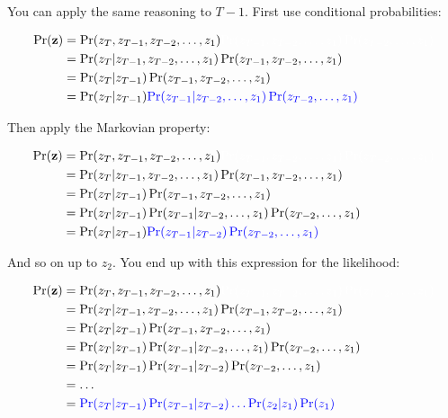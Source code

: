 \documentclass[
  12pt,
]{krantz}
\begin{document}
You can apply the same reasoning to \(T-1\). First use conditional probabilities:

\begin{align*}
\Pr(\mathbf{z}) &= \Pr(z_T, z_{T-1}, z_{T-2}, \ldots, z_1) \color{white}{\Pr(z_{T-1}, z_{T-2},\ldots, z_1) \Pr(z_{T-2}, \ldots, z_1)}\\
                &= \Pr(z_T | z_{T-1}, z_{T-2},\ldots, z_1) \Pr(z_{T-1}, z_{T-2},\ldots, z_1) \\
                &= \Pr(z_T | z_{T-1}) \Pr(z_{T-1}, z_{T-2},\ldots, z_1) \\
                &= \Pr(z_T | z_{T-1}) \color{blue}{\Pr(z_{T-1} | z_{T-2}, \ldots, z_1) \Pr(z_{T-2}, \ldots, z_1)}\\
\end{align*}

Then apply the Markovian property:

\begin{align*}
\Pr(\mathbf{z}) &= \Pr(z_T, z_{T-1}, z_{T-2}, \ldots, z_1) \color{white}{\Pr(z_{T-1}, z_{T-2},\ldots, z_1) \Pr(z_{T-2}, \ldots, z_1)}\\
                &= \Pr(z_T | z_{T-1}, z_{T-2},\ldots, z_1) \Pr(z_{T-1}, z_{T-2},\ldots, z_1) \\
                &= \Pr(z_T | z_{T-1}) \Pr(z_{T-1}, z_{T-2},\ldots, z_1) \\
                &= \Pr(z_T | z_{T-1}) \Pr(z_{T-1} | z_{T-2}, \ldots, z_1) \Pr(z_{T-2}, \ldots, z_1)\\
                &= \Pr(z_T | z_{T-1}) \color{blue}{\Pr(z_{T-1} | z_{T-2})} \Pr(z_{T-2}, \ldots, z_1)\\
\end{align*}

And so on up to \(z_2\). You end up with this expression for the likelihood:

\begin{align*}
\Pr(\mathbf{z}) &= \Pr(z_T, z_{T-1}, z_{T-2}, \ldots, z_1) \color{white}{\Pr(z_{T-1}, z_{T-2},\ldots, z_1) \Pr(z_{T-2}, \ldots, z_1)}\\
                &= \Pr(z_T | z_{T-1}, z_{T-2},\ldots, z_1) \Pr(z_{T-1}, z_{T-2},\ldots, z_1) \\
                &= \Pr(z_T | z_{T-1}) \Pr(z_{T-1}, z_{T-2},\ldots, z_1) \\
                &= \Pr(z_T | z_{T-1}) \Pr(z_{T-1} | z_{T-2}, \ldots, z_1) \Pr(z_{T-2}, \ldots, z_1)\\
                &= \Pr(z_T | z_{T-1}) \Pr(z_{T-1} | z_{T-2}) \Pr(z_{T-2}, \ldots, z_1)\\
                &= \ldots \\
                &= \color{blue}{\Pr(z_T | z_{T-1}) \Pr(z_{T-1} | z_{T-2}) \ldots \Pr(z_{2} | z_{1}) \Pr(z_{1})}\\
\end{align*}
\end{document}
